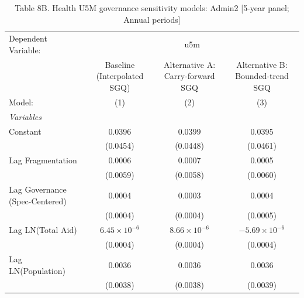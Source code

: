 
\begin{table}[H]
   \caption{Table 8B. Health U5M governance sensitivity models: Admin2 [5-year panel; Annual periods]}
   \centering
   \begin{tabular}{lccc}
      \tabularnewline \midrule \midrule
      Dependent Variable: & \multicolumn{3}{c}{u5m}\\
                                                         & Baseline (Interpolated SGQ) & Alternative A: Carry-forward SGQ & Alternative B: Bounded-trend SGQ \\   
      Model:                                             & (1)                         & (2)                              & (3)\\  
      \midrule
      \emph{Variables}\\
      Constant                                           & 0.0396                      & 0.0399                           & 0.0395\\   
                                                         & (0.0454)                    & (0.0448)                         & (0.0461)\\   
      Lag Fragmentation                                  & 0.0006                      & 0.0007                           & 0.0005\\   
                                                         & (0.0059)                    & (0.0058)                         & (0.0060)\\   
      Lag Governance (Spec-Centered)                     & 0.0004                      & 0.0003                           & 0.0004\\   
                                                         & (0.0004)                    & (0.0004)                         & (0.0005)\\   
      Lag LN(Total Aid)                                  & $6.45\times 10^{-6}$        & $8.66\times 10^{-6}$             & $-5.69\times 10^{-6}$\\    
                                                         & (0.0004)                    & (0.0004)                         & (0.0004)\\   
      Lag LN(Population)                                 & 0.0036                      & 0.0036                           & 0.0036\\   
                                                         & (0.0038)                    & (0.0038)                         & (0.0039)\\   

\end{tabular}
\end{table}
